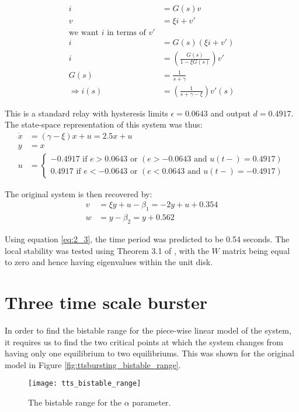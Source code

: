 \documentclass[a4paper, 12pt]{article}
\begin{document}
\begin{appendices}
\begin{align}
i &= G(s)v \\
v &= \xi i + v' \\
\text{we want $i$ in terms of $v'$}\\
i &= G(s)(\xi i + v') \\
i &= \left(\frac{G(s)}{1-\xi G(s)}\right)v'\\
G(s) &= \frac{1}{s + \gamma}\\
\Rightarrow i(s) &= \left(\frac{1}{s+\gamma-\xi}\right)v'(s)
\end{align}

This is a standard relay with hysteresis limits $\epsilon = 0.0643$ and output $d = 0.4917$. The state-space representation of this system was thus:
\begin{align}
\dot{x} &= (\gamma-\xi)x + u = 2.5x + u \\
y &= x \\
u &= \begin{cases}
	               -0.4917 \text{ if } e > 0.0643 \text{ or } (e >-0.0643 \text{ and } u(t-) = 0.4917)\\
	                0.4917 \text{ if } e < -0.0643 \text{ or } (e < 0.0643 \text{ and } u(t-) = -0.4917)	              
	            \end{cases}
\end{align}

The original system is then recovered by:
\begin{align}
v&= \xi y + u - \beta_1 = -2y+u+0.354 \\
w&= y - \beta_2 = y + 0.562 
\end{align}

Using equation \ref{eq:2_3}, the time period was predicted to be 0.54 seconds. The local stability was tested using Theorem 3.1 of \cite{astrom1995}, with the $W$ matrix being equal to zero and hence having eigenvalues within the unit disk. 

\section{Three time scale burster}

In order to find the bistable range for the piece-wise linear model of the system, it requires us to find the two critical points at which the system changes from having only one equilibrium to two equilibriums. This was shown for the original model in Figure \ref{fig:ttsbursting_bistable_range}. 

\begin{figure}[h!]
\texttt{[image: tts\_bistable\_range]}
\caption{The bistable range for the $\alpha$ parameter.}
\end{figure}


\end{appendices}
\end{document}
